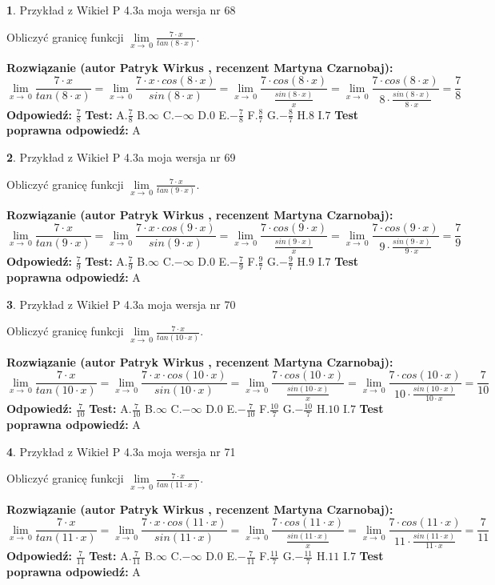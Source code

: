 \documentclass[12pt, a4paper]{article}
\theoremstyle{definition} %
\newtheorem{zad}{}
\newcommand{\zadStart}[1]{\begin{zad}#1\newline}
\newcommand{\zadStop}{\end{zad}}
\newcommand{\rozwStart}[2]{\noindent \textbf{Rozwiązanie (autor #1 , recenzent #2): }\newline}
\newcommand{\rozwStop}{\newline}
\newcommand{\odpStart}{\noindent \textbf{Odpowiedź:}\newline}
\newcommand{\odpStop}{\newline}
\newcommand{\testStart}{\noindent \textbf{Test:}\newline}
\newcommand{\testStop}{\newline}
\newcommand{\kluczStart}{\noindent \textbf{Test poprawna odpowiedź:}\newline}
\newcommand{\kluczStop}{\newline}
\begin{document}
\zadStart{Przykład z Wikieł P 4.3a moja wersja nr 68}


Obliczyć granicę funkcji $\lim\limits_{x\to\ 0}\frac{7 \cdot x}{tan(8 \cdot x)}$.
\zadStop
\rozwStart{Patryk Wirkus}{Martyna Czarnobaj}
$$\lim\limits_{x\to\ 0}\frac{7 \cdot x}{tan(8 \cdot x)}=\lim\limits_{x\to\ 0}\frac{7 \cdot x \cdot cos(8 \cdot x)}{sin(8 \cdot x)}=\lim\limits_{x\to\ 0}\frac{7 \cdot cos(8 \cdot x)}{\frac{sin(8 \cdot x)}{x}}=\lim\limits_{x\to\ 0}\frac{7 \cdot cos(8 \cdot x)}{8 \cdot \frac{sin(8 \cdot x)}{8 \cdot x}} = \frac{7}{8}$$
\rozwStop
\odpStart
$\frac{7}{8}$
\odpStop
\testStart
A.$\frac{7}{8}$
B.$\infty$
C.$-\infty$
D.$0$
E.$-\frac{7}{8}$
F.$\frac{8}{7}$
G.$-\frac{8}{7}$
H.$8$
I.$7$
\testStop
\kluczStart
A
\kluczStop



\zadStart{Przykład z Wikieł P 4.3a moja wersja nr 69}


Obliczyć granicę funkcji $\lim\limits_{x\to\ 0}\frac{7 \cdot x}{tan(9 \cdot x)}$.
\zadStop
\rozwStart{Patryk Wirkus}{Martyna Czarnobaj}
$$\lim\limits_{x\to\ 0}\frac{7 \cdot x}{tan(9 \cdot x)}=\lim\limits_{x\to\ 0}\frac{7 \cdot x \cdot cos(9 \cdot x)}{sin(9 \cdot x)}=\lim\limits_{x\to\ 0}\frac{7 \cdot cos(9 \cdot x)}{\frac{sin(9 \cdot x)}{x}}=\lim\limits_{x\to\ 0}\frac{7 \cdot cos(9 \cdot x)}{9 \cdot \frac{sin(9 \cdot x)}{9 \cdot x}} = \frac{7}{9}$$
\rozwStop
\odpStart
$\frac{7}{9}$
\odpStop
\testStart
A.$\frac{7}{9}$
B.$\infty$
C.$-\infty$
D.$0$
E.$-\frac{7}{9}$
F.$\frac{9}{7}$
G.$-\frac{9}{7}$
H.$9$
I.$7$
\testStop
\kluczStart
A
\kluczStop



\zadStart{Przykład z Wikieł P 4.3a moja wersja nr 70}


Obliczyć granicę funkcji $\lim\limits_{x\to\ 0}\frac{7 \cdot x}{tan(10 \cdot x)}$.
\zadStop
\rozwStart{Patryk Wirkus}{Martyna Czarnobaj}
$$\lim\limits_{x\to\ 0}\frac{7 \cdot x}{tan(10 \cdot x)}=\lim\limits_{x\to\ 0}\frac{7 \cdot x \cdot cos(10 \cdot x)}{sin(10 \cdot x)}=\lim\limits_{x\to\ 0}\frac{7 \cdot cos(10 \cdot x)}{\frac{sin(10 \cdot x)}{x}}=\lim\limits_{x\to\ 0}\frac{7 \cdot cos(10 \cdot x)}{10 \cdot \frac{sin(10 \cdot x)}{10 \cdot x}} = \frac{7}{10}$$
\rozwStop
\odpStart
$\frac{7}{10}$
\odpStop
\testStart
A.$\frac{7}{10}$
B.$\infty$
C.$-\infty$
D.$0$
E.$-\frac{7}{10}$
F.$\frac{10}{7}$
G.$-\frac{10}{7}$
H.$10$
I.$7$
\testStop
\kluczStart
A
\kluczStop



\zadStart{Przykład z Wikieł P 4.3a moja wersja nr 71}


Obliczyć granicę funkcji $\lim\limits_{x\to\ 0}\frac{7 \cdot x}{tan(11 \cdot x)}$.
\zadStop
\rozwStart{Patryk Wirkus}{Martyna Czarnobaj}
$$\lim\limits_{x\to\ 0}\frac{7 \cdot x}{tan(11 \cdot x)}=\lim\limits_{x\to\ 0}\frac{7 \cdot x \cdot cos(11 \cdot x)}{sin(11 \cdot x)}=\lim\limits_{x\to\ 0}\frac{7 \cdot cos(11 \cdot x)}{\frac{sin(11 \cdot x)}{x}}=\lim\limits_{x\to\ 0}\frac{7 \cdot cos(11 \cdot x)}{11 \cdot \frac{sin(11 \cdot x)}{11 \cdot x}} = \frac{7}{11}$$
\rozwStop
\odpStart
$\frac{7}{11}$
\odpStop
\testStart
A.$\frac{7}{11}$
B.$\infty$
C.$-\infty$
D.$0$
E.$-\frac{7}{11}$
F.$\frac{11}{7}$
G.$-\frac{11}{7}$
H.$11$
I.$7$
\testStop
\kluczStart
A
\kluczStop
\end{document}
